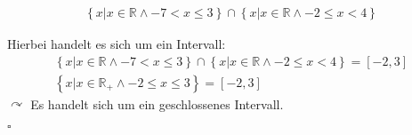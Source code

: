 \begin{eqnarray}
	\left\{x \vert x \in \mathbb{R} \land -7 < x \le 3 \right\} \cap \left\{x \vert x \in \mathbb{R} \land -2 \le x < 4 \right\}
\end{eqnarray}

Hierbei handelt es sich um ein Intervall: \\

\begin{eqnarray}
	\left\{x \vert x \in \mathbb{R} \land -7 < x \le 3 \right\} \cap \left\{x \vert x \in \mathbb{R} \land -2 \le x < 4 \right\} = \left[-2,3\right]\\
	\left\{ x | x \in \mathbb{R}_{+} \land -2\le x \le 3 \right\} = \left[-2,3\right]
\end{eqnarray}
$\curvearrowright$ Es handelt sich um ein geschlossenes Intervall.


$\square$